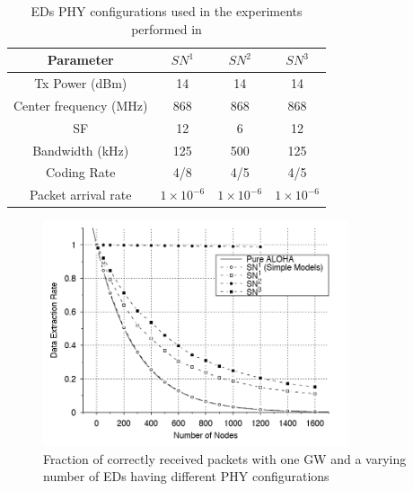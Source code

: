 \begin{table}[tph]
\centering
\begin{tabular}{|c|c|c|c|}
\hline
Parameter &  $SN^1$ & $SN^2$ & $SN^3$\\ \hline
 Tx Power (dBm) & 14 & 14 & 14  \\ \hline
 Center frequency (MHz) & 868 & 868 & 868 \\ \hline
 \gls{SF} & 12 & 6 & 12  \\ \hline
 Bandwidth (kHz) & 125 & 500 & 125  \\ \hline
 Coding Rate & 4/8 & 4/5 & 4/5 \\ \hline 
 Packet arrival rate & $1 \times 10^{-6}$ & $1 \times 10^{-6}$ & $1 \times 10^{-6}$  \\ \hline
\end{tabular}
\caption{\glspl{ED} PHY configurations used in the experiments performed in \cite{ref:soa-lora-scal3}}
\label{tab:lorasim1}

\end{table}

\begin{figure}[tph]
    \centering
    \includegraphics[width=0.8\textwidth]{images/lorasim1.png}
    \caption{Fraction of correctly received packets with one \gls{GW} and a varying number of \glspl{ED} having different PHY configurations \cite{ref:soa-lora-scal3}}
    \label{fig:lorasim1}
\end{figure}

